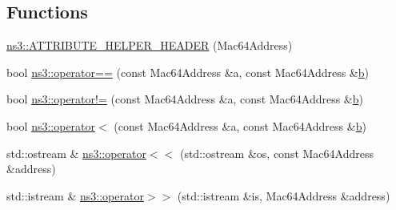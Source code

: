 \subsection*{Functions}
\begin{DoxyCompactItemize}
\item 
\hyperlink{namespacens3_a1c0ba4cabdf2ad955649785e44b3c2eb}{ns3\+::\+A\+T\+T\+R\+I\+B\+U\+T\+E\+\_\+\+H\+E\+L\+P\+E\+R\+\_\+\+H\+E\+A\+D\+ER} (Mac64\+Address)
\item 
bool \hyperlink{namespacens3_aba13f40029b390d625f3678785fd3888}{ns3\+::operator==} (const Mac64\+Address \&a, const Mac64\+Address \&\hyperlink{lte__pathloss_8m_a21ad0bd836b90d08f4cf640b4c298e7c}{b})
\item 
bool \hyperlink{namespacens3_a249f11b89501cd7d7e97dc98a1e490d1}{ns3\+::operator!=} (const Mac64\+Address \&a, const Mac64\+Address \&\hyperlink{lte__pathloss_8m_a21ad0bd836b90d08f4cf640b4c298e7c}{b})
\item 
bool \hyperlink{namespacens3_a96e139617733862b1a608455f02765ee}{ns3\+::operator$<$} (const Mac64\+Address \&a, const Mac64\+Address \&\hyperlink{lte__pathloss_8m_a21ad0bd836b90d08f4cf640b4c298e7c}{b})
\item 
std\+::ostream \& \hyperlink{namespacens3_aa62a92e2929fcf4a85b10569b2d8591d}{ns3\+::operator$<$$<$} (std\+::ostream \&os, const Mac64\+Address \&address)
\item 
std\+::istream \& \hyperlink{namespacens3_a941a058d49e6ba31855892cdbeb6b74f}{ns3\+::operator$>$$>$} (std\+::istream \&is, Mac64\+Address \&address)
\end{DoxyCompactItemize}
